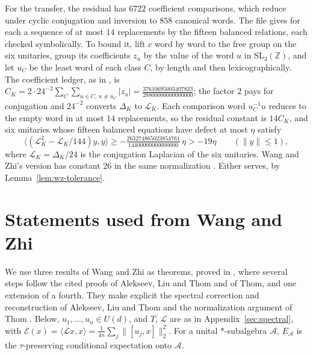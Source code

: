 \documentclass[11pt]{article}
\begin{document}
For the transfer, the residual has $6722$ coefficient comparisons, which reduce under cyclic conjugation and inversion to $858$ canonical words.  The file  gives for each a sequence of at most $14$ replacements by the fifteen balanced relations, each checked symbolically.  To bound it, lift $c$ word by word to the free group on the six unitaries, group its coefficients $z_u$ by the value of the word $u$ in $\mathrm{SL}_3(\mathbb Z)$, and let $u_C$ be the least word of each class $C$, by length and then lexicographically.  The coefficient ledger, as in \cite[(3.10)]{WangZhi26}, is $C_K=2\cdot24^{-2}\sum_C\sum_{u\in C,\,u\ne u_C}|z_u|=\tfrac{37610695003407823}{28800000000000000}$; the factor $2$ pays for conjugation and $24^{-2}$ converts $\Delta_K$ to $\mathcal L_K$.  Each comparison word $u_C^{-1}u$ reduces to the empty word in at most $14$ replacements, so the residual constant is $14C_K$, and six unitaries whose fifteen balanced equations have defect at most $\eta$ satisfy
\begin{equation}\label{eq:integer-residual}
 \langle(\mathcal L_K^2-\mathcal L_K/144)y,y\rangle\ge-\tfrac{263274865023854761}{14400000000000000}\,\eta>-19\eta\qquad(\|y\|\le1),
\end{equation}
where $\mathcal L_K=\Delta_K/24$ is the conjugation Laplacian of the six unitaries.  Wang and Zhi's version has constant $26$ in the same normalization \cite[(3.12)]{WangZhi26}.  Either serves, by Lemma~\ref{lem:wz-tolerance}.

\section{Statements used from Wang and Zhi}\label{sec:rigidity}

We use three results of Wang and Zhi as theorems, proved in \cite{WangZhi26}, where several steps follow the cited proofs of Alekseev, Liu and Thom and of Thom, and one extension of a fourth.  They make explicit the spectral correction and reconstruction of Alekseev, Liu and Thom \cite[Theorems~4.3 and~5.2, Corollary~5.1]{AlekseevLiuThom26} and the normalization argument of Thom \cite[Proposition~3.1, Lemma~4.1, Theorem~4.2]{Thom26}.  Below, $u_1,\dots,u_n\in U(d)$, and $T$, $\mathcal L$ are as in Appendix~\ref{sec:spectral}, with $\mathcal E(x)=\langle\mathcal Lx,x\rangle=\frac1{4n}\sum_j\|[u_j,x]\|_2^2$.  For a unital $*$-subalgebra $\mathcal A$, $E_{\mathcal A}$ is the $\tau$-preserving conditional expectation onto $\mathcal A$.
\end{document}

